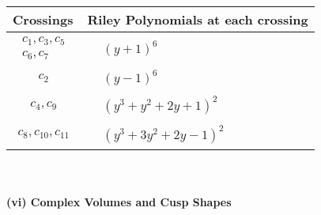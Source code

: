 \documentclass[1p]{elsarticle_modified}
\theoremstyle{definition}
\begin{document}
\begin{tabular}{m{50pt}|m{274pt}}
Crossings & \hspace{64pt}Riley Polynomials at each crossing \\
\hline $$\begin{aligned}c_{1},c_{3},c_{5}\\c_{6},c_{7}\end{aligned}$$&$\begin{aligned}
&(y+1)^6
\end{aligned}$\\
\hline $$\begin{aligned}c_{2}\end{aligned}$$&$\begin{aligned}
&(y-1)^6
\end{aligned}$\\
\hline $$\begin{aligned}c_{4},c_{9}\end{aligned}$$&$\begin{aligned}
&(y^3+y^2+2 y+1)^2
\end{aligned}$\\
\hline $$\begin{aligned}c_{8},c_{10},c_{11}\end{aligned}$$&$\begin{aligned}
&(y^3+3 y^2+2 y-1)^2
\end{aligned}$\\
\hline
\end{tabular}\\~\\
\newpage\flushleft \textbf{(vi) Complex Volumes and Cusp Shapes}
\end{document}

